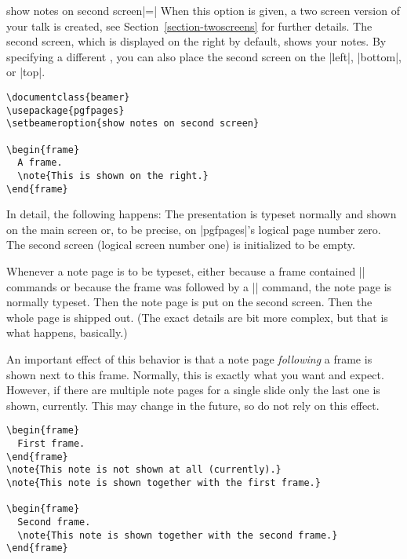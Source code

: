 \begin{beameroption}{show notes on second screen}{|=|}
  \label{command-notesonsecondscreen}
  When this option is given, a two screen version of your talk is created, see Section~\ref{section-twoscreens} for further details. The second screen, which is displayed on the right by default, shows your notes. By   specifying a different , you can also place the second screen on the |left|, |bottom|, or |top|.

  \example
\begin{verbatim}
\documentclass{beamer}
\usepackage{pgfpages}
\setbeameroption{show notes on second screen}

\begin{frame}
  A frame.
  \note{This is shown on the right.}
\end{frame}

\end{verbatim}

  In detail, the following happens: The presentation is typeset normally and shown on the main screen or, to be precise, on |pgfpages|'s logical page number zero. The second screen (logical screen number one) is initialized to be empty.

  Whenever a note page is to be typeset, either because a frame contained |\note| commands or because the frame was followed by a |\note| command, the note page is normally typeset. Then the note page is put on the second screen. Then the whole page is shipped out. (The exact details are bit more complex, but that is what happens, basically.)

  An important effect of this behavior is that a note page \emph{following} a frame is shown next to this frame. Normally, this is exactly what you want and expect. However, if there are multiple note pages for a single slide only the last one is shown, currently. This may change in the future, so do not rely on this effect.

  \example
\begin{verbatim}
\begin{frame}
  First frame.
\end{frame}
\note{This note is not shown at all (currently).}
\note{This note is shown together with the first frame.}

\begin{frame}
  Second frame.
  \note{This note is shown together with the second frame.}
\end{frame}


\end{verbatim}
\end{beameroption}
